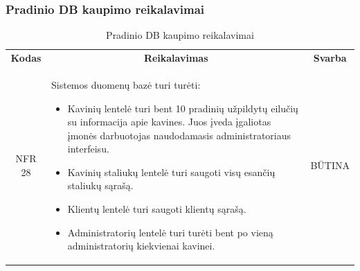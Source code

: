 \documentclass{VUMIFPSkursinis}
\begin{document}
\subsubsection{Pradinio DB kaupimo reikalavimai}
\begin{center}
	\begin{table}[H]
	\caption{Pradinio DB kaupimo reikalavimai}
	\begin{tabular}{|p{2cm}|p{}|p{}|}
	\hline
	    \rowcolor{lightgray}
		\multicolumn{3}{|c|}{Pradinio DB kaupimo reikalavimai}\\
		
	\hline
		\multicolumn{1}{|c|}{{\bfseries Kodas}}&
		\multicolumn{1}{|c|}{{\bfseries Reikalavimas}}&
		\multicolumn{1}{|c|}{{\bfseries Svarba}}\\
	\hline 	
		\multicolumn{1}{|c|}{NFR 28}&
		{Sistemos duomenų bazė turi turėti:
			\begin{itemize}
				\item Kavinių lentelė turi bent 10 pradinių užpildytų eilučių su informacija apie kavines. Juos įveda įgaliotas įmonės darbuotojas naudodamasis administratoriaus interfeisu.
				\item Kavinių staliukų lentelė turi saugoti visų esančių staliukų sąrašą.
				\item Klientų lentelė turi saugoti klientų sąrašą.
				\item Administratorių lentelė turi turėti bent po vieną administratorių kiekvienai kavinei.
			\end{itemize}}&
		\multicolumn{1}{|c|}{BŪTINA}\\	
	
	\hline 	
	
	\end{tabular}
	\end{table}

\end{center}
\end{document}
